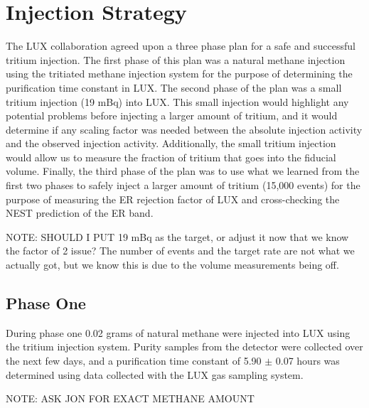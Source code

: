 \section{Injection Strategy}

The LUX collaboration agreed upon a three phase plan for a safe and successful tritium injection.  The first phase of this plan was a natural methane injection using the tritiated methane injection system for the purpose of determining the purification time constant in LUX.  The second phase of the plan was a small tritium injection (19 mBq) into LUX.  This small injection would highlight any potential problems before injecting a larger amount of tritium, and it would determine if any scaling factor was needed between the absolute injection activity and the observed injection activity.  Additionally, the small tritium injection would allow us to measure the fraction of tritium that goes into the fiducial volume.  Finally, the third phase of the plan was to use what we learned from the first two phases to safely inject a larger amount of tritium (15,000 events) for the purpose of measuring the ER rejection factor of LUX and cross-checking the NEST prediction of the ER band.

NOTE: SHOULD I PUT 19 mBq as the target, or adjust it now that we know the factor of 2 issue? The number of events and the target rate are not what we actually got, but we know this is due to the volume measurements being off.


\subsection{Phase One}

During phase one 0.02 grams of natural methane were injected into LUX using the tritium injection system.  Purity samples from the detector were collected over the next few days, and a purification time constant of 5.90 $\pm$ 0.07 hours was determined using data collected with the LUX gas sampling system.

NOTE: ASK JON FOR EXACT METHANE AMOUNT


